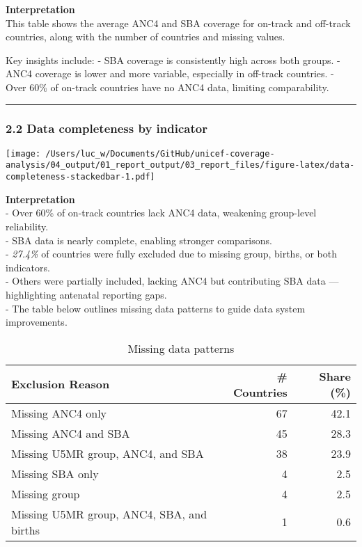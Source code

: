 \documentclass[
]{article}
\begin{document}
\textbf{Interpretation}\\
This table shows the average ANC4 and SBA coverage for on-track and
off-track countries, along with the number of countries and missing
values.

Key insights include: - SBA coverage is consistently high across both
groups. - ANC4 coverage is lower and more variable, especially in
off-track countries. - Over 60\% of on-track countries have no ANC4
data, limiting comparability.

\begin{center}\rule{0.5\linewidth}{0.5pt}\end{center}

\subsubsection{2.2 Data completeness by
indicator}\label{data-completeness-by-indicator}

\texttt{[image: /Users/luc\_w/Documents/GitHub/unicef-coverage-analysis/04\_output/01\_report\_output/03\_report\_files/figure-latex/data-completeness-stackedbar-1.pdf]}

\textbf{Interpretation}\\
- Over 60\% of on-track countries lack ANC4 data, weakening group-level
reliability.\\
- SBA data is nearly complete, enabling stronger comparisons.\\
- \emph{27.4\%} of countries were fully excluded due to missing group,
births, or both indicators.\\
- Others were partially included, lacking ANC4 but contributing SBA data
--- highlighting antenatal reporting gaps.\\
- The table below outlines missing data patterns to guide data system
improvements.

\begin{longtable}[t]{lrr}
\caption{\label{tab:exclusion-summary-table}Missing data patterns}\\
\toprule
Exclusion Reason & \# Countries & Share (\%)\\
\midrule
Missing ANC4 only & 67 & 42.1\\
Missing ANC4 and SBA & 45 & 28.3\\
Missing U5MR group, ANC4, and SBA & 38 & 23.9\\
Missing SBA only & 4 & 2.5\\
Missing group & 4 & 2.5\\
\addlinespace
Missing U5MR group, ANC4, SBA, and births & 1 & 0.6\\
\bottomrule
\end{longtable}
\end{document}
